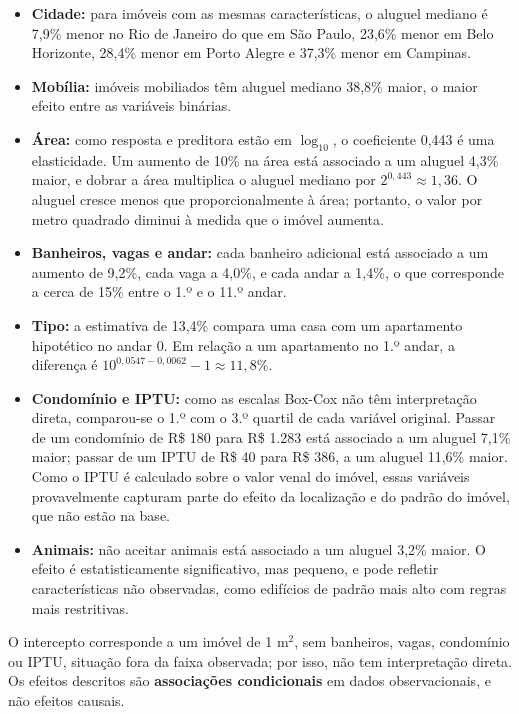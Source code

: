 \documentclass[12pt,a4paper]{article}
\begin{document}
\begin{itemize}
  \item \textbf{Cidade:} para imóveis com as mesmas características, o aluguel mediano é 7,9\% menor no Rio de Janeiro do que em São Paulo, 23,6\% menor em Belo Horizonte, 28,4\% menor em Porto Alegre e 37,3\% menor em Campinas.
  \item \textbf{Mobília:} imóveis mobiliados têm aluguel mediano 38,8\% maior, o maior efeito entre as variáveis binárias.
  \item \textbf{Área:} como resposta e preditora estão em $\log_{10}$, o coeficiente 0,443 é uma elasticidade. Um aumento de 10\% na área está associado a um aluguel 4,3\% maior, e dobrar a área multiplica o aluguel mediano por $2^{0{,}443}\approx1{,}36$. O aluguel cresce menos que proporcionalmente à área; portanto, o valor por metro quadrado diminui à medida que o imóvel aumenta.
  \item \textbf{Banheiros, vagas e andar:} cada banheiro adicional está associado a um aumento de 9,2\%, cada vaga a 4,0\%, e cada andar a 1,4\%, o que corresponde a cerca de 15\% entre o 1.º e o 11.º andar.
  \item \textbf{Tipo:} a estimativa de 13,4\% compara uma casa com um apartamento hipotético no andar 0. Em relação a um apartamento no 1.º andar, a diferença é $10^{0{,}0547-0{,}0062}-1\approx11{,}8\%$.
  \item \textbf{Condomínio e IPTU:} como as escalas Box-Cox não têm interpretação direta, comparou-se o 1.º com o 3.º quartil de cada variável original. Passar de um condomínio de R\$ 180 para R\$ 1.283 está associado a um aluguel 7,1\% maior; passar de um IPTU de R\$ 40 para R\$ 386, a um aluguel 11,6\% maior. Como o IPTU é calculado sobre o valor venal do imóvel, essas variáveis provavelmente capturam parte do efeito da localização e do padrão do imóvel, que não estão na base.
  \item \textbf{Animais:} não aceitar animais está associado a um aluguel 3,2\% maior. O efeito é estatisticamente significativo, mas pequeno, e pode refletir características não observadas, como edifícios de padrão mais alto com regras mais restritivas.
\end{itemize}

O intercepto corresponde a um imóvel de 1 m$^2$, sem banheiros, vagas, condomínio ou IPTU, situação fora da faixa observada; por isso, não tem interpretação direta. Os efeitos descritos são \textbf{associações condicionais} em dados observacionais, e não efeitos causais.
\end{document}

